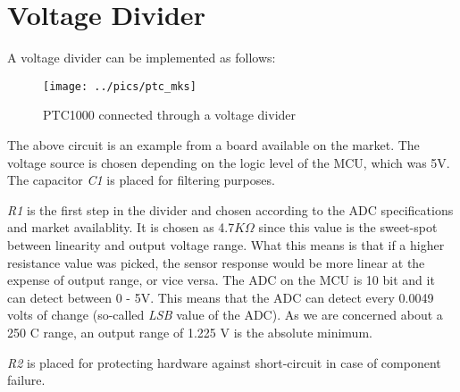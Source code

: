 \section*{Voltage Divider}

A voltage divider can be implemented as follows:
\begin{figure}[H]
    \centering
    \texttt{[image: ../pics/ptc\_mks]}
    \caption{PTC1000 connected through a voltage divider\cite{mksboard}}
\end{figure}
The above circuit is an example from a board available on the market. \cite{mksboard} The voltage source is chosen depending on the logic level of the MCU, which was 5V. The capacitor \textit{C1} is placed for filtering purposes.

\textit{R1} is the first step in the divider and chosen according to the ADC specifications and market availablity. It is chosen as 4.7$K\Omega$ since this value is the sweet-spot between linearity and output voltage range. What this means is that if a higher resistance value was picked, the sensor response would be more linear at the expense of output range, or vice versa. The ADC on the MCU is 10 bit and it can detect between 0 - 5V. This means that the ADC can detect every 0.0049 volts of change (so-called \textit{LSB} value of the ADC). As we are concerned about a 250 \degree C range, an output range of 1.225 V is the absolute minimum.

\textit{R2} is placed for protecting hardware against short-circuit in case of component failure.
